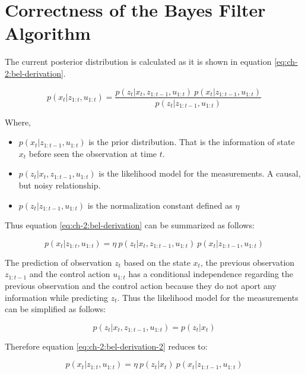 \section{Correctness of the Bayes Filter Algorithm}\label{sec:ap:bayes-filter}
The current posterior distribution is calculated as it is shown in equation \ref{eq:ch-2:bel-derivation}.

\begin{equation}\label{eq:ch-2:bel-derivation}
p(x_t| z_{1:t}, u_{1:t}) = \frac{p(z_t | x_t, z_{1:t-1}, u_{1:t}) \: p(x_t | z_{1:t-1}, u_{1:t})}{p(z_t | z_{1:t-1}, u_{1:t})}
\end{equation}

Where,

\begin{itemize}
\item $p(x_t | z_{1:t-1}, u_{1:t})$ is the prior distribution. That is the information of state $x_t$ before seen the observation at time $t$.
\item $p(z_t | x_t, z_{1:t-1}, u_{1:t})$ is the likelihood model for the measurements. A causal, but noisy relationship\cite{Sarkka:bayesian-filters}. 
\item $p(z_t | z_{1:t-1}, u_{1:t})$ is the normalization constant defined as $\eta$
\end{itemize}

Thus equation \ref{eq:ch-2:bel-derivation} can be summarized as follows:

\begin{equation} \label{eq:ch-2:bel-derivation-2}
p(x_t| z_{1:t}, u_{1:t}) = \eta \: p(z_t | x_t, z_{1:t-1}, u_{1:t}) \: p(x_t | z_{1:t-1}, u_{1:t}) 
\end{equation}

The prediction of observation $z_t$ based on the state $x_t$, the previous observation $z_{1:t-1}$ and the control action $u_{1:t}$ has a conditional independence regarding the previous observation and the control action because they do not aport any information while predicting $z_t$. Thus the likelihood model for the measurements can be simplified as follows:

\begin{equation}
p(z_t | x_t, z_{1:t-1}, u_{1:t}) = p(z_t | x_t)
\end{equation}

Therefore equation \ref{eq:ch-2:bel-derivation-2} reduces to:

\begin{equation} \label{eq:ch-2:bel-derivation-3}
p(x_t| z_{1:t}, u_{1:t}) = \eta \: p(z_t | x_t) \: p(x_t | z_{1:t-1}, u_{1:t})
\end{equation}

